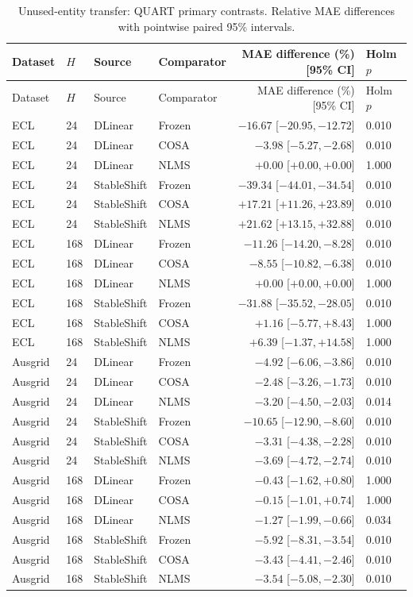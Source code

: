 \begin{longtable}{lllp{}rp{}}
\caption{Unused-entity transfer: QUART primary contrasts. Relative MAE differences with pointwise paired 95\% intervals.}\label{tab:withheld_primary}\\
\toprule
Dataset & $H$ & Source & Comparator & MAE difference (\%) [95\% CI] & Holm $p$\\
\midrule
\endfirsthead
\toprule
Dataset & $H$ & Source & Comparator & MAE difference (\%) [95\% CI] & Holm $p$\\
\midrule
\endhead
ECL & 24 & DLinear & Frozen & $-16.67$ [$ -20.95, -12.72 $] & 0.010\\
ECL & 24 & DLinear & COSA & $-3.98$ [$ -5.27, -2.68 $] & 0.010\\
ECL & 24 & DLinear & NLMS & $+0.00$ [$ +0.00, +0.00 $] & 1.000\\
ECL & 24 & StableShift & Frozen & $-39.34$ [$ -44.01, -34.54 $] & 0.010\\
ECL & 24 & StableShift & COSA & $+17.21$ [$ +11.26, +23.89 $] & 0.010\\
ECL & 24 & StableShift & NLMS & $+21.62$ [$ +13.15, +32.88 $] & 0.010\\
ECL & 168 & DLinear & Frozen & $-11.26$ [$ -14.20, -8.28 $] & 0.010\\
ECL & 168 & DLinear & COSA & $-8.55$ [$ -10.82, -6.38 $] & 0.010\\
ECL & 168 & DLinear & NLMS & $+0.00$ [$ +0.00, +0.00 $] & 1.000\\
ECL & 168 & StableShift & Frozen & $-31.88$ [$ -35.52, -28.05 $] & 0.010\\
ECL & 168 & StableShift & COSA & $+1.16$ [$ -5.77, +8.43 $] & 1.000\\
ECL & 168 & StableShift & NLMS & $+6.39$ [$ -1.37, +14.58 $] & 1.000\\
Ausgrid & 24 & DLinear & Frozen & $-4.92$ [$ -6.06, -3.86 $] & 0.010\\
Ausgrid & 24 & DLinear & COSA & $-2.48$ [$ -3.26, -1.73 $] & 0.010\\
Ausgrid & 24 & DLinear & NLMS & $-3.20$ [$ -4.50, -2.03 $] & 0.014\\
Ausgrid & 24 & StableShift & Frozen & $-10.65$ [$ -12.90, -8.60 $] & 0.010\\
Ausgrid & 24 & StableShift & COSA & $-3.31$ [$ -4.38, -2.28 $] & 0.010\\
Ausgrid & 24 & StableShift & NLMS & $-3.69$ [$ -4.72, -2.74 $] & 0.010\\
Ausgrid & 168 & DLinear & Frozen & $-0.43$ [$ -1.62, +0.80 $] & 1.000\\
Ausgrid & 168 & DLinear & COSA & $-0.15$ [$ -1.01, +0.74 $] & 1.000\\
Ausgrid & 168 & DLinear & NLMS & $-1.27$ [$ -1.99, -0.66 $] & 0.034\\
Ausgrid & 168 & StableShift & Frozen & $-5.92$ [$ -8.31, -3.54 $] & 0.010\\
Ausgrid & 168 & StableShift & COSA & $-3.43$ [$ -4.41, -2.46 $] & 0.010\\
Ausgrid & 168 & StableShift & NLMS & $-3.54$ [$ -5.08, -2.30 $] & 0.010\\
\bottomrule
\end{longtable}
